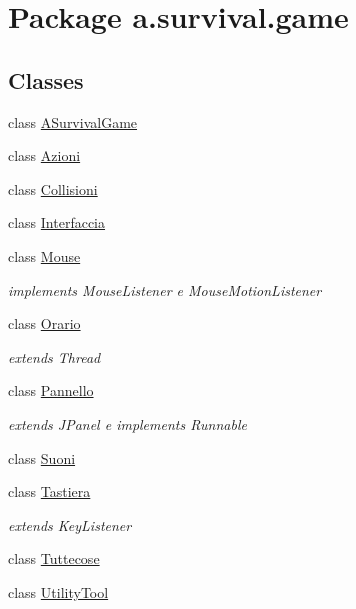 \hypertarget{namespacea_1_1survival_1_1game}{}\section{Package a.\+survival.\+game}
\label{namespacea_1_1survival_1_1game}
\subsection*{Classes}
\begin{DoxyCompactItemize}
\item 
class \hyperlink{classa_1_1survival_1_1game_1_1_a_survival_game}{A\+Survival\+Game}
\item 
class \hyperlink{classa_1_1survival_1_1game_1_1_azioni}{Azioni}
\item 
class \hyperlink{classa_1_1survival_1_1game_1_1_collisioni}{Collisioni}
\item 
class \hyperlink{classa_1_1survival_1_1game_1_1_interfaccia}{Interfaccia}
\item 
class \hyperlink{classa_1_1survival_1_1game_1_1_mouse}{Mouse}
\begin{DoxyCompactList}\small\item\em implements Mouse\+Listener e Mouse\+Motion\+Listener \end{DoxyCompactList}\item 
class \hyperlink{classa_1_1survival_1_1game_1_1_orario}{Orario}
\begin{DoxyCompactList}\small\item\em extends Thread \end{DoxyCompactList}\item 
class \hyperlink{classa_1_1survival_1_1game_1_1_pannello}{Pannello}
\begin{DoxyCompactList}\small\item\em extends J\+Panel e implements Runnable \end{DoxyCompactList}\item 
class \hyperlink{classa_1_1survival_1_1game_1_1_suoni}{Suoni}
\item 
class \hyperlink{classa_1_1survival_1_1game_1_1_tastiera}{Tastiera}
\begin{DoxyCompactList}\small\item\em extends Key\+Listener \end{DoxyCompactList}\item 
class \hyperlink{classa_1_1survival_1_1game_1_1_tuttecose}{Tuttecose}
\item 
class \hyperlink{classa_1_1survival_1_1game_1_1_utility_tool}{Utility\+Tool}
\end{DoxyCompactItemize}
